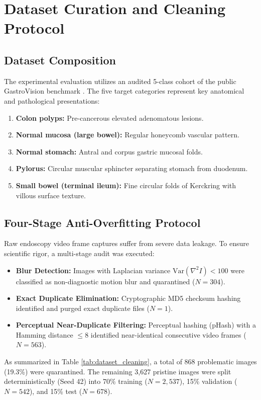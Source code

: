 \documentclass[conference]{IEEEtran}
\begin{document}
\section{Dataset Curation and Cleaning Protocol}

\subsection{Dataset Composition}
The experimental evaluation utilizes an audited 5-class cohort of the public GastroVision benchmark \cite{b8}. The five target categories represent key anatomical and pathological presentations:
\begin{enumerate}
    \item \textbf{Colon polyps:} Pre-cancerous elevated adenomatous lesions.
    \item \textbf{Normal mucosa (large bowel):} Regular honeycomb vascular pattern.
    \item \textbf{Normal stomach:} Antral and corpus gastric mucosal folds.
    \item \textbf{Pylorus:} Circular muscular sphincter separating stomach from duodenum.
    \item \textbf{Small bowel (terminal ileum):} Fine circular folds of Kerckring with villous surface texture.
\end{enumerate}

\subsection{Four-Stage Anti-Overfitting Protocol}
Raw endoscopy video frame captures suffer from severe data leakage. To ensure scientific rigor, a multi-stage audit was executed:
\begin{itemize}
    \item \textbf{Blur Detection:} Images with Laplacian variance $\text{Var}(\nabla^2 I) < 100$ were classified as non-diagnostic motion blur and quarantined ($N=304$).
    \item \textbf{Exact Duplicate Elimination:} Cryptographic MD5 checksum hashing identified and purged exact duplicate files ($N=1$).
    \item \textbf{Perceptual Near-Duplicate Filtering:} Perceptual hashing (pHash) with a Hamming distance $\leq 8$ identified near-identical consecutive video frames ($N=563$).
\end{itemize}

As summarized in Table \ref{tab:dataset_cleaning}, a total of 868 problematic images (19.3\%) were quarantined. The remaining 3,627 pristine images were split deterministically (Seed 42) into 70\% training ($N=2,537$), 15\% validation ($N=542$), and 15\% test ($N=678$).
\end{document}
